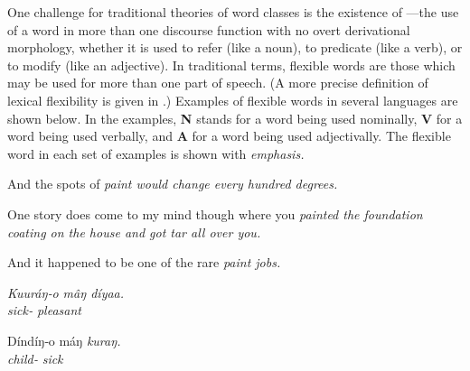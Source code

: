 One challenge for traditional theories of word classes is the existence of —the use of a word in more than one discourse function with no overt derivational morphology, whether it is used to refer (like a noun), to predicate (like a verb), or to modify (like an adjective). In traditional terms, flexible words are those which may be used for more than one part of speech. (A more precise definition of lexical flexibility is given in .) Examples of flexible words in several languages are shown below. In the examples, \textbf{N} stands for a word being used nominally, \textbf{V} for a word being used verbally, and \textbf{A} for a word being used adjectivally. The flexible word in each set of examples is shown with \em{emphasis}.

\begin{exe}

  \ex\label{ex:1.1}
  \begin{xlist}

     And the spots of \em{paint} would change every hundred degrees.

     One story does come to my mind though where you \em{painted} the foundation coating on the house and got tar all over you.

     And it happened to be one of the rare \em{paint} jobs.

  \end{xlist}

  \ex\label{ex:1.2}
  \begin{xlist}

    \gll \em{Kuuráŋ}‑o      mâŋ          díyaa.\\
         \em{sick}‑  pleasant\\

    \gll Díndíŋ‑o       máŋ          \em{kuraŋ}.\\
         child‑  \em{sick}\\

  \end{xlist}


\end{exe}
